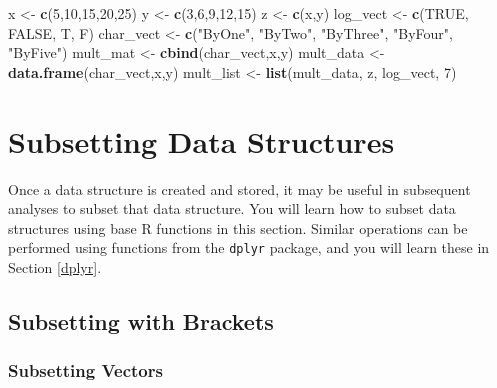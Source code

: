 \documentclass[
]{book}
\newenvironment{Shaded}{\begin{snugshade}}{\end{snugshade}}
\newcommand{\ConstantTok}[1]{\textcolor[rgb]{0.56,0.35,0.01}{#1}}
\newcommand{\DecValTok}[1]{\textcolor[rgb]{0.00,0.00,0.81}{#1}}
\newcommand{\FunctionTok}[1]{\textcolor[rgb]{0.13,0.29,0.53}{\textbf{#1}}}
\newcommand{\NormalTok}[1]{#1}
\newcommand{\OtherTok}[1]{\textcolor[rgb]{0.56,0.35,0.01}{#1}}
\newcommand{\StringTok}[1]{\textcolor[rgb]{0.31,0.60,0.02}{#1}}
\theoremstyle{definition}
\theoremstyle{definition}
\theoremstyle{definition}
\theoremstyle{definition}
\theoremstyle{remark}
\begin{document}
\begin{Shaded}
\begin{Highlighting}[]
\NormalTok{x }\OtherTok{\textless{}{-}} \FunctionTok{c}\NormalTok{(}\DecValTok{5}\NormalTok{,}\DecValTok{10}\NormalTok{,}\DecValTok{15}\NormalTok{,}\DecValTok{20}\NormalTok{,}\DecValTok{25}\NormalTok{)}
\NormalTok{y }\OtherTok{\textless{}{-}} \FunctionTok{c}\NormalTok{(}\DecValTok{3}\NormalTok{,}\DecValTok{6}\NormalTok{,}\DecValTok{9}\NormalTok{,}\DecValTok{12}\NormalTok{,}\DecValTok{15}\NormalTok{)}
\NormalTok{z }\OtherTok{\textless{}{-}} \FunctionTok{c}\NormalTok{(x,y)}
\NormalTok{log\_vect }\OtherTok{\textless{}{-}} \FunctionTok{c}\NormalTok{(}\ConstantTok{TRUE}\NormalTok{, }\ConstantTok{FALSE}\NormalTok{, T, F)}
\NormalTok{char\_vect }\OtherTok{\textless{}{-}} \FunctionTok{c}\NormalTok{(}\StringTok{"ByOne"}\NormalTok{, }\StringTok{"ByTwo"}\NormalTok{, }\StringTok{"ByThree"}\NormalTok{, }\StringTok{"ByFour"}\NormalTok{, }\StringTok{"ByFive"}\NormalTok{)}
\NormalTok{mult\_mat }\OtherTok{\textless{}{-}} \FunctionTok{cbind}\NormalTok{(char\_vect,x,y)}
\NormalTok{mult\_data }\OtherTok{\textless{}{-}} \FunctionTok{data.frame}\NormalTok{(char\_vect,x,y)}
\NormalTok{mult\_list }\OtherTok{\textless{}{-}} \FunctionTok{list}\NormalTok{(mult\_data, z, log\_vect, }\DecValTok{7}\NormalTok{)}
\end{Highlighting}
\end{Shaded}

\hypertarget{subsetting-data-structures}{%
\section{Subsetting Data Structures}\label{subsetting-data-structures}}

Once a data structure is created and stored, it may be useful in subsequent analyses to subset that data structure. You will learn how to subset data structures using base R functions in this section. Similar operations can be performed using functions from the \texttt{dplyr} package, and you will learn these in Section \ref{dplyr}.

\hypertarget{subsetting-with-brackets}{%
\subsection{Subsetting with Brackets}\label{subsetting-with-brackets}}

\hypertarget{subsetting-vectors}{%
\subsubsection{Subsetting Vectors}\label{subsetting-vectors}}
\end{document}
